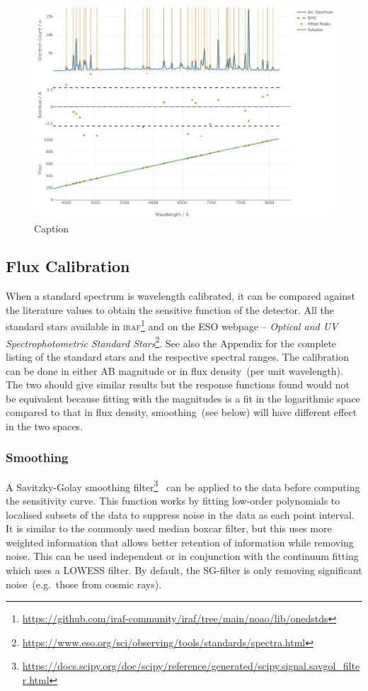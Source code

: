 \documentclass[fleqn,usenatbib]{mnras}
\begin{document}
\begin{figure}
    \centering
    \includegraphics[width=\columnwidth]{fig_05_wavelength_calibration_diagnostics.jpg}
    \caption{Caption}
    \label{fig:wavecal}
\end{figure}

\subsection{Flux Calibration}
When a standard spectrum is wavelength calibrated, it can be
compared against the literature values to obtain the sensitive
function of the detector. All the standard stars available in
\textsc{iraf}\footnote{\url{https://github.com/iraf-community/iraf/tree/main/noao/lib/onedstds}}
and on the ESO webpage -- \textit{Optical and UV Spectrophotometric
Standard Stars}\footnote{\url{https://www.eso.org/sci/observing/tools/standards/spectra.html}}.
See also the Appendix for the complete listing of the standard
stars and the respective spectral ranges.
The calibration can be done in either AB magnitude or in
flux density~(per unit wavelength). The two should give similar
results but the response functions found would not be equivalent
because fitting with the magnitudes is a fit in the logarithmic
space compared to that in flux density, smoothing~(see below)
will have different effect in the two spaces.

\subsubsection*{Smoothing}
A Savitzky-Golay smoothing
filter\footnote{\url{https://docs.scipy.org/doc/scipy/reference/generated/scipy.signal.savgol_filter.html}}~\citep[hereafter, SG-filter]{1964AnaCh..36.1627S}
can be applied to the data before computing the sensitivity curve.
This function works by fitting low-order polynomials to localised
subsets of the data to suppress noise in the data as each point
interval. It is similar to the commonly used median boxcar filter,
but this uses more weighted information that allows better
retention of information while removing noise. This can be
used independent or in conjunction with the continuum fitting which
uses a LOWESS filter. By default, the SG-filter is only removing
significant noise~(e.g.\ those from cosmic rays).
\end{document}
